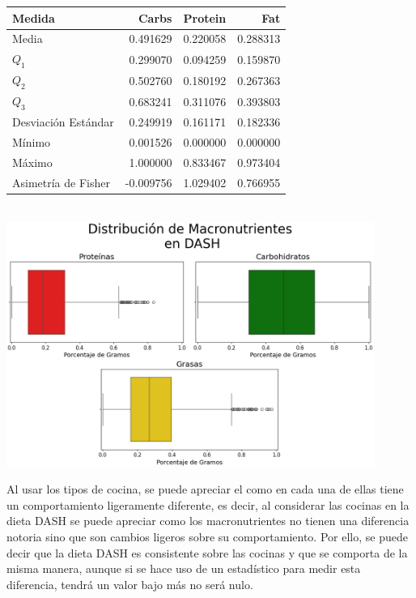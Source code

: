 \documentclass[12pt,a4paper]{article}
\begin{document}
{{            \begin{center}
                \begin{tabular}{l|rrr}
                \toprule
                    Medida & Carbs & Protein & Fat \\
                \midrule
                    Media               & 0.491629 & 0.220058 & 0.288313 \\
                    $Q_1$               & 0.299070 & 0.094259 & 0.159870 \\
                    $Q_2$               & 0.502760 & 0.180192 & 0.267363 \\
                    $Q_3$               & 0.683241 & 0.311076 & 0.393803 \\
                    Desviación Estándar & 0.249919 & 0.161171 & 0.182336 \\
                    Mínimo              & 0.001526 & 0.000000 & 0.000000 \\
                    Máximo              & 1.000000 & 0.833467 & 0.973404 \\
                    Asimetría de Fisher & -0.009756 & 1.029402 & 0.766955 \\
                \bottomrule
                \end{tabular}\\
                \vspace{0.5cm}
                \includegraphics[width=0.9\textwidth]{Resources/EDA/Dash_1.png}
            \end{center}

            Al usar los tipos de cocina, se puede apreciar el como en cada una de 
            ellas tiene un comportamiento ligeramente diferente, es decir, al considerar 
            las cocinas en la dieta DASH se puede apreciar como los macronutrientes no 
            tienen una diferencia notoria sino que son cambios ligeros sobre su comportamiento. 
            Por ello, se puede decir que la dieta DASH es consistente sobre las cocinas y 
            que se comporta de la misma manera, aunque si se hace uso de un estadístico para 
            medir esta diferencia, tendrá un valor bajo más no será nulo.

}}
\end{document}
